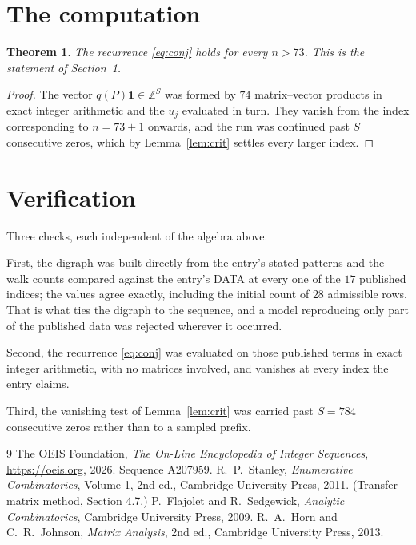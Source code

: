 \documentclass[11pt,a4paper]{article}
\theoremstyle{plain}
\newtheorem{theorem}{Theorem}
\theoremstyle{definition}
\begin{document}
\section{The computation}

\begin{theorem}
The recurrence \eqref{eq:conj} holds for every $n>73$. This is the statement of
Section~1.
\end{theorem}

\begin{proof}
The vector $q(P)\mathbf{1}\in\mathbb{Z}^{S}$ was formed by $74$ matrix--vector
products in exact integer arithmetic and the $u_j$ evaluated in turn. They vanish from the
index corresponding to $n=73+1$ onwards, and the run was continued past $S$ consecutive
zeros, which by Lemma~\ref{lem:crit} settles every larger index.
\end{proof}

\section{Verification}

Three checks, each independent of the algebra above.

First, the digraph was built directly from the entry's stated patterns and the walk counts
compared against the entry's DATA at every one of the $17$ published indices; the
values agree exactly, including the initial count of $28$ admissible rows. That is
what ties the digraph to the sequence, and a model reproducing only part of the published
data was rejected wherever it occurred.

Second, the recurrence \eqref{eq:conj} was evaluated on those published terms in exact
integer arithmetic, with no matrices involved, and vanishes at every index the entry claims.

Third, the vanishing test of Lemma~\ref{lem:crit} was carried past $S=784$ consecutive
zeros rather than to a sampled prefix.

\begin{thebibliography}{9}
 The OEIS Foundation, \emph{The On-Line Encyclopedia of Integer
Sequences}, \url{https://oeis.org}, 2026. Sequence A207959.
 R.~P.~Stanley, \emph{Enumerative Combinatorics}, Volume 1, 2nd ed.,
Cambridge University Press, 2011. (Transfer-matrix method, Section 4.7.)
 P.~Flajolet and R.~Sedgewick, \emph{Analytic Combinatorics}, Cambridge
University Press, 2009.
 R.~A.~Horn and C.~R.~Johnson, \emph{Matrix Analysis}, 2nd ed., Cambridge
University Press, 2013.
\end{thebibliography}
\end{document}
